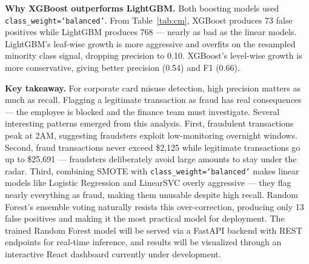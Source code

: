\documentclass{article}
\begin{document}
\textbf{Why XGBoost outperforms LightGBM.}
Both boosting models used \texttt{class\_weight=`balanced'}. From
Table~\ref{tab:cm}, XGBoost produces 73 false positives while LightGBM
produces 768 --- nearly as bad as the linear models. LightGBM's
leaf-wise growth is more aggressive and overfits on the resampled
minority class signal, dropping precision to 0.10. XGBoost's level-wise
growth is more conservative, giving better precision (0.54) and F1
(0.66).

\textbf{Key takeaway.}
For corporate card misuse detection, high precision matters as much as
recall. Flagging a legitimate transaction as fraud has real consequences
--- the employee is blocked and the finance team must investigate.
Several interesting patterns emerged from this analysis. First,
fraudulent transactions peak at 2AM, suggesting fraudsters exploit
low-monitoring overnight windows. Second, fraud transactions never exceed
\$2,125 while legitimate transactions go up to \$25,691 --- fraudsters
deliberately avoid large amounts to stay under the radar. Third,
combining SMOTE with \texttt{class\_weight=`balanced'} makes linear
models like Logistic Regression and LinearSVC overly aggressive ---
they flag nearly everything as fraud, making them unusable despite high
recall. Random Forest's ensemble voting naturally resists this
over-correction, producing only 13 false positives and making it the
most practical model for deployment. The trained Random Forest model
will be served via a FastAPI backend with REST endpoints for real-time
inference, and results will be visualized through an interactive React
dashboard currently under development.



\end{document}
